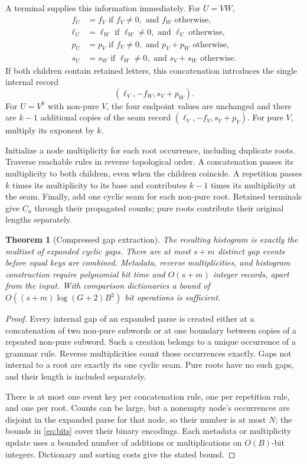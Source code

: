 \documentclass[11pt,letterpaper]{article}
\newtheorem{theorem}{Theorem}[section]
\theoremstyle{definition}
\theoremstyle{remark}\newtheorem{remark}[theorem]{Remark}
\begin{document}
A terminal supplies this information immediately. For $U=VW$,
\begin{align*}
 f_U&=f_V\text{ if }f_V\ne0,\text{ and }f_W\text{ otherwise},\\
 \ell_U&=\ell_W\text{ if }\ell_W\ne0,\text{ and }\ell_V\text{ otherwise},\\
 p_U&=p_V\text{ if }f_V\ne0,\text{ and }p_V+p_W\text{ otherwise},\\
 s_U&=s_W\text{ if }\ell_W\ne0,\text{ and }s_V+s_W\text{ otherwise}.
\end{align*}
If both children contain retained letters, this concatenation introduces the
single internal record
\[
 (\ell_V,-f_W,s_V+p_W).
\]
For $U=V^k$ with non-pure $V$, the four endpoint values are unchanged and there
are $k-1$ additional copies of the seam record
$(\ell_V,-f_V,s_V+p_V)$. For pure $V$, multiply its exponent by $k$.

Initialize a node multiplicity for each root occurrence, including duplicate
roots. Traverse reachable rules in reverse topological order. A concatenation
passes its multiplicity to both children, even when the children coincide.
A repetition passes $k$ times its multiplicity to its base and contributes
$k-1$ times its multiplicity at the seam. Finally, add one cyclic seam for each
non-pure root. Retained terminals give $C_a$ through their propagated counts;
pure roots contribute their original lengths separately.

\begin{theorem}[Compressed gap extraction]
The resulting histogram is exactly the multiset of expanded cyclic gaps.
There are at most $s+m$ distinct gap events before equal keys are combined.
Metadata, reverse multiplicities, and histogram construction require
polynomial bit time and $O(s+m)$ integer records, apart from the input.
With comparison dictionaries a bound of
$O((s+m)\log(G+2)B^2)$ bit operations is sufficient.
\end{theorem}
\begin{proof}
Every internal gap of an expanded parse is created either at a concatenation
of two non-pure subwords or at one boundary between copies of a repeated
non-pure subword. Such a creation belongs to a unique occurrence of a grammar
rule. Reverse multiplicities count those occurrences exactly. Gaps not
internal to a root are exactly its one cyclic seam. Pure roots have no such
gaps, and their length is included separately.

There is at most one event key per concatenation rule, one per repetition
rule, and one per root. Counts can be large, but a nonempty node's occurrences
are disjoint in the expanded parse for that node, so their number is at most
$N$; the bounds in \eqref{eq:bits} cover their binary encodings. Each metadata
or multiplicity update uses a bounded number of additions or multiplications
on $O(B)$-bit integers. Dictionary and sorting costs give the stated bound.
\end{proof}
\end{document}

